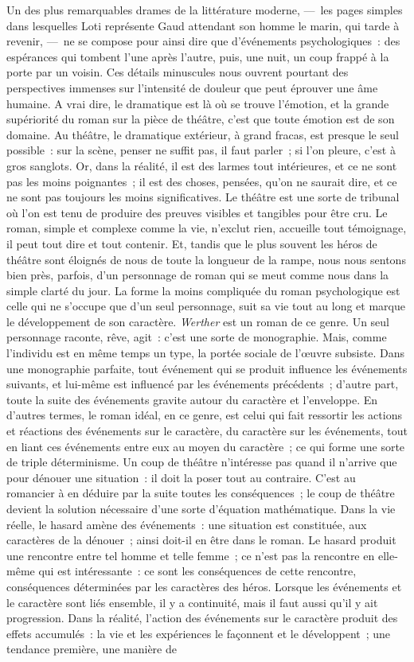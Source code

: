 \documentclass[french,twoside]{book} %
\begin{document}
Un des plus remarquables drames de la littérature moderne, — les pages simples dans lesquelles Loti représente Gaud attendant son homme le marin, qui tarde à revenir, — ne se compose pour ainsi dire que d’événements psychologiques : des espérances qui tombent l’une après l’autre, puis, une nuit, un coup frappé à la porte par un voisin. Ces détails minuscules nous ouvrent pourtant des perspectives immenses sur l’intensité de douleur que peut éprouver une âme humaine. A vrai dire, le dramatique est là où se trouve l’émotion, et la grande supériorité du roman sur la pièce de théâtre, c’est que toute émotion est de son domaine. Au théâtre, le dramatique extérieur, à grand fracas, est presque le seul possible : sur la scène, penser ne suffit pas, il faut parler ; si l’on pleure, c’est à gros sanglots. Or, dans la réalité, il est des larmes tout intérieures, et ce ne sont pas les moins poignantes ; il est des choses, pensées, qu’on ne saurait dire, et ce ne sont pas toujours les moins significatives. Le théâtre est une sorte de tribunal où l’on est tenu de produire des preuves visibles et tangibles pour être cru. Le roman, simple et complexe comme la vie, n’exclut rien, accueille tout témoignage, il peut tout dire et tout contenir. Et, tandis que le plus souvent les héros de théâtre sont éloignés de nous de toute la longueur de la rampe, nous nous sentons bien près, parfois, d’un personnage de roman qui se meut comme nous dans la simple clarté du jour. La forme la moins compliquée du roman psychologique est celle qui ne s’occupe que d’un seul personnage, suit sa vie tout au long et marque le développement de son caractère. \emph{Werther} est un roman de ce genre. Un seul personnage raconte, rêve, agit : c’est une sorte de monographie. Mais, comme l’individu est en même temps un type, la portée sociale de l’œuvre subsiste. Dans une monographie parfaite, tout événement qui se produit influence les événements suivants, et lui-même est influencé par les événements précédents ; d’autre part, toute la suite des événements gravite autour du caractère et l’enveloppe. En d’autres termes, le roman idéal, en ce genre, est celui qui fait ressortir les actions et réactions des événements sur le caractère, du caractère sur les événements, tout en liant ces événements entre eux au moyen du caractère ; ce qui forme une sorte de triple déterminisme. Un coup de théâtre n’intéresse pas quand il n’arrive que pour dénouer une situation : il doit la poser tout au contraire. C’est au romancier à en déduire par la suite toutes les conséquences ; le coup de théâtre devient la solution nécessaire d’une sorte d’équation mathématique. Dans la vie réelle, le hasard amène des événements : une situation est constituée, aux caractères de la dénouer ; ainsi doit-il en être dans le roman. Le hasard produit une rencontre entre tel homme et telle femme ; ce n’est pas la rencontre en elle-même qui est intéressante : ce sont les conséquences de cette rencontre, conséquences déterminées par les caractères des héros. Lorsque les événements et le caractère sont liés ensemble, il y a continuité, mais il faut aussi qu’il y ait progression. Dans la réalité, l’action des événements sur le caractère produit des effets accumulés : la vie et les expériences le façonnent et le développent ; une tendance première, une manière de 
\end{document}
